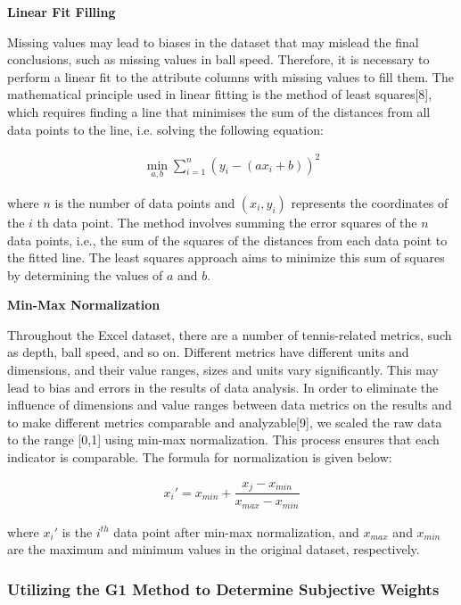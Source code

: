\documentclass[12pt]{article}  %
\begin{document}
\noindent\textbf{Linear Fit Filling}

Missing values may lead to biases in the dataset that may mislead the final conclusions, such as missing values in ball speed. Therefore, it is necessary to perform a linear fit to the attribute columns with missing values to fill them. The mathematical principle used in linear fitting is the method of least squares[8], which requires finding a line that minimises the sum of the distances from all data points to the line, i.e. solving the following equation:

\begin{eqnarray}
	\mathop{min}_{a, b} \sum_{i=1}^n(y_i-(ax_i+b))^2
\end{eqnarray}

where \(n\) is the number of data points and \((x_i, y_i)\) represents the coordinates of the \(i\) th data point. The method involves summing the error squares of the \(n\) data points, i.e., the sum of the squares of the distances from each data point to the fitted line. The least squares approach aims to minimize this sum of squares by determining the values of \(a\) and \(b\).

\noindent\textbf{Min-Max Normalization}

Throughout the Excel dataset, there are a number of tennis-related metrics, such as depth, ball speed, and so on. Different metrics have different units and dimensions, and their value ranges, sizes and units vary significantly. This may lead to bias and errors in the results of data analysis. In order to eliminate the influence of dimensions and value ranges between data metrics on the results and to make different metrics comparable and analyzable[9], we scaled the raw data to the range [0,1] using min-max normalization. This process ensures that each indicator is comparable. The formula for normalization is given below:

\begin{eqnarray}
	x_i'=x_{min}+\dfrac{x_j-x_{min}}{x_{max}-x_{min}}
\end{eqnarray}

where \(x_i'\) is the \(i^{th}\) data point after min-max normalization, and \(x_{max}\) and \(x_{min}\) are the maximum and minimum values in the original dataset, respectively.

\subsubsection{Utilizing the G1 Method to Determine Subjective Weights}
\end{document}
